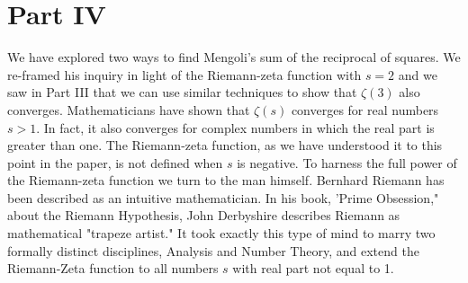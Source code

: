 \documentclass[12pt,oneside]{amsart}
\theoremstyle{definition}
\theoremstyle{remark}
\numberwithin{equation}{exer}
\begin{document}
\newpage 
\section*{Part IV}
 \indent
We have explored two ways to find Mengoli's sum of the reciprocal of squares. We re-framed his inquiry in light of the Riemann-zeta function with $s=2$ and we saw in Part III that we can use similar techniques to show that $\zeta(3)$ also converges. Mathematicians have shown that $\zeta(s)$ converges for real numbers $s>1$. In fact, it also converges for complex numbers in which the real part is greater than one. 
\newline \indent 
The Riemann-zeta function, as we have understood it to this point in the paper, is not defined when $s$ is negative. To harness the full power of the Riemann-zeta function we turn to the man himself. Bernhard Riemann has been described as an intuitive mathematician. In his book, 'Prime Obsession," about the Riemann Hypothesis, John Derbyshire describes Riemann as mathematical "trapeze artist." It took exactly this type of mind to marry two formally distinct disciplines, Analysis and Number Theory, and extend the Riemann-Zeta function to all numbers $s$ with real part not equal to 1. 
\end{document}
